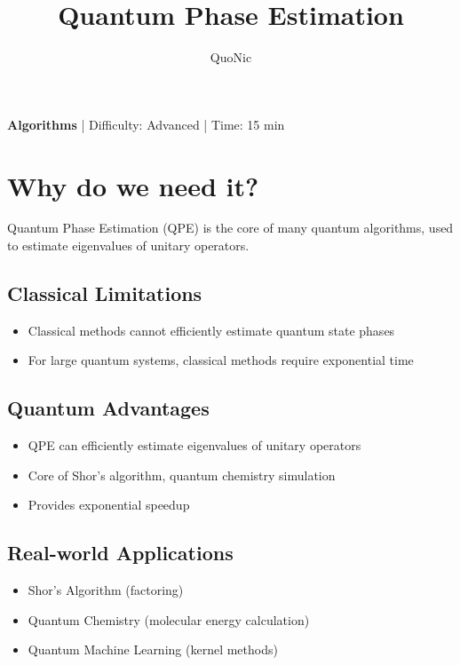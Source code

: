 \documentclass[12pt,a4paper]{article}
\title{Quantum Phase Estimation}
\author{QuoNic}
\date{}
\begin{document}
\maketitle

\begin{center}
\textbf{Algorithms} | Difficulty: Advanced | Time: 15 min
\end{center}

\tableofcontents
\newpage

\section{Why do we need it?}

Quantum Phase Estimation (QPE) is the core of many quantum algorithms, used to estimate eigenvalues of unitary operators.

\subsection{Classical Limitations}
\begin{itemize}
  \item Classical methods cannot efficiently estimate quantum state phases
  \item For large quantum systems, classical methods require exponential time
\end{itemize}

\subsection{Quantum Advantages}
\begin{itemize}
  \item QPE can efficiently estimate eigenvalues of unitary operators
  \item Core of Shor's algorithm, quantum chemistry simulation
  \item Provides exponential speedup
\end{itemize}

\subsection{Real-world Applications}
\begin{itemize}
  \item Shor's Algorithm (factoring)
  \item Quantum Chemistry (molecular energy calculation)
  \item Quantum Machine Learning (kernel methods)
\end{itemize}
\end{document}
